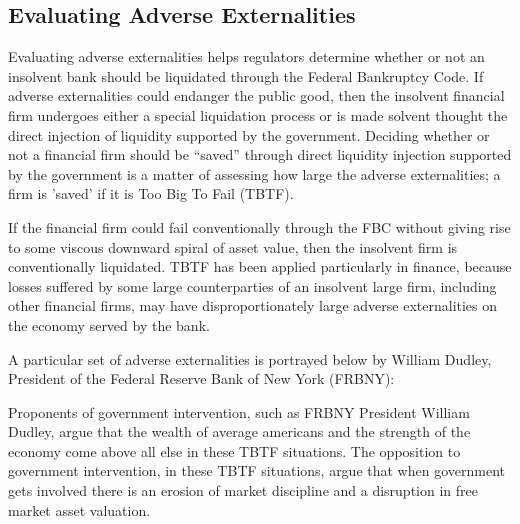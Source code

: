 \subsection{Evaluating Adverse Externalities}
Evaluating adverse externalities helps regulators determine whether or not an insolvent bank should be liquidated through the Federal Bankruptcy Code.  If adverse externalities could endanger the public good, then the insolvent financial firm undergoes either a special liquidation process or is made solvent thought the direct injection of liquidity supported by the government.  Deciding whether or not a financial firm should be ``saved'' through direct liquidity injection supported by the government is a matter of assessing how large the adverse externalities; a firm is 'saved' if it is Too Big To Fail (TBTF).  

If the financial firm could fail conventionally through the FBC without giving rise to some viscous downward spiral of asset value, then the insolvent firm is conventionally liquidated.  TBTF has been applied particularly in finance, because losses suffered by some large counterparties of an insolvent large firm, including other financial firms, may have disproportionately large adverse externalities on the economy served by the bank.\cite{Kaufman}

A particular set of adverse externalities is portrayed below by William Dudley, President of the Federal Reserve Bank of New York (FRBNY):


\noindent Proponents of government intervention, such as FRBNY President William Dudley, argue that the wealth of average americans and the strength of the economy come above all else in these TBTF situations.  The opposition to government intervention, in these TBTF situations, argue that when government gets involved there is an erosion of market discipline and a disruption in free market asset valuation.


